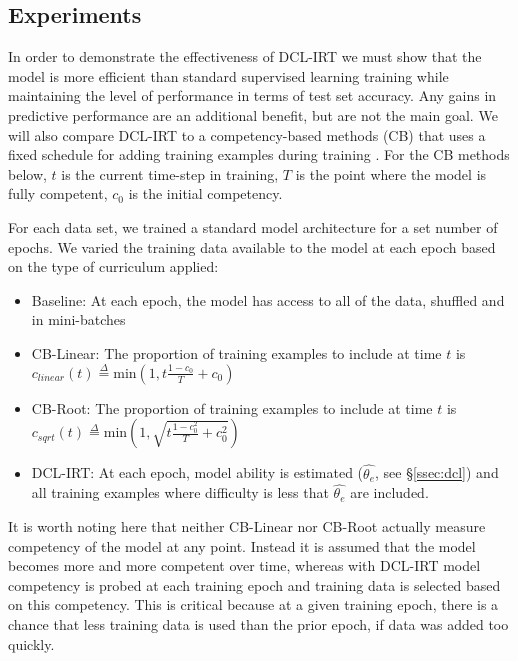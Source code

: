 \documentclass[letterpaper]{article} %
\begin{document}
\subsection{Experiments} 

In order to demonstrate the effectiveness of DCL-IRT we must show that the model is more efficient than standard supervised learning training while maintaining the level of performance in terms of test set accuracy. 
Any gains in predictive performance are an additional benefit, but are not the main goal.
We will also compare DCL-IRT to a competency-based methods (CB) that uses a fixed schedule for adding training examples during training \cite{platanios_competence-based_2019}.
For the CB methods below, $t$ is the current time-step in training, $T$ is the point where the model is fully competent, $c_0$ is the initial competency. 

For each data set, we trained a standard model architecture for a set number of epochs. 
We varied the training data available to the model at each epoch based on the type of curriculum applied:

\begin{itemize}
	\item 
	Baseline: At each epoch, the model has access to all of the data, shuffled and in mini-batches
	\item 
	CB-Linear: The proportion of training examples to include at time $t$ is $c_{linear}(t) \overset{\Delta}{=} \text{min} (1, t\frac{1-c_0}{T} + c_0)$
	\item 
	CB-Root: The proportion of training examples to include at time $t$ is $c_{sqrt}(t) \overset{\Delta}{=} \text{min}(1, \sqrt{t\frac{1-c_0^2}{T} + c_0^2})$
	\item 
	DCL-IRT: At each epoch, model ability is estimated ($\hat{\theta_e}$, see \S \ref{ssec:dcl}) and all training examples where difficulty is less that $\hat{\theta_e}$ are included.
\end{itemize}

It is worth noting here that neither CB-Linear nor CB-Root actually measure competency of the model at any point. 
Instead it is assumed that the model becomes more and more competent over time, whereas with DCL-IRT model competency is probed at each training epoch and training data is selected based on this competency.
This is critical because at a given training epoch, there is a chance that less training data is used than the prior epoch, if data was added too quickly.
\end{document}
